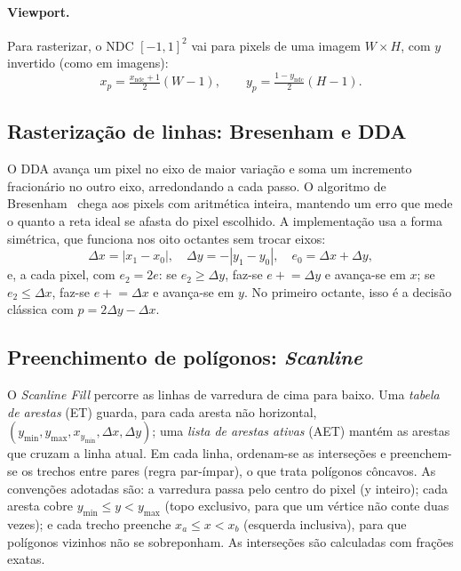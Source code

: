 \documentclass[11pt, a4paper]{article}
\begin{document}
\paragraph{Viewport.} Para rasterizar, o NDC $[-1,1]^2$ vai para pixels de uma imagem
$W\times H$, com $y$ invertido (como em imagens):
\begin{equation}
 x_p=\tfrac{x_{\text{ndc}}+1}{2}(W-1), \qquad y_p=\tfrac{1-y_{\text{ndc}}}{2}(H-1).
\end{equation}

\subsection{Rasterização de linhas: Bresenham e DDA}
O DDA avança um pixel no eixo de maior variação e soma um incremento fracionário no
outro eixo, arredondando a cada passo. O algoritmo de Bresenham~\cite{bresenham1965}
chega aos pixels com aritmética inteira, mantendo um erro que mede o quanto a reta
ideal se afasta do pixel escolhido. A implementação usa a forma simétrica, que
funciona nos oito octantes sem trocar eixos:
\begin{equation}
 \Delta x=|x_1-x_0|,\quad \Delta y=-|y_1-y_0|,\quad e_0=\Delta x+\Delta y,
\end{equation}
e, a cada pixel, com $e_2=2e$: se $e_2\ge\Delta y$, faz-se $e\mathrel{+}=\Delta y$ e avança-se em $x$;
se $e_2\le\Delta x$, faz-se $e\mathrel{+}=\Delta x$ e avança-se em $y$. No primeiro octante,
isso é a decisão clássica com $p=2\Delta y-\Delta x$.

\subsection{Preenchimento de polígonos: \emph{Scanline}}
O \emph{Scanline Fill} percorre as linhas de varredura de cima para baixo. Uma
\emph{tabela de arestas} (ET) guarda, para cada aresta não horizontal,
$(y_{\min},y_{\max},x_{y_{\min}},\Delta x,\Delta y)$; uma \emph{lista de arestas ativas}
(AET) mantém as arestas que cruzam a linha atual. Em cada linha, ordenam-se as
interseções e preenchem-se os trechos entre pares (regra par-ímpar), o que
trata polígonos côncavos. As convenções adotadas são: a varredura passa pelo centro
do pixel (y inteiro); cada aresta cobre $y_{\min}\le y<y_{\max}$ (topo exclusivo, para que
um vértice não conte duas vezes); e cada trecho preenche $x_a\le x<x_b$ (esquerda
inclusiva), para que polígonos vizinhos não se sobreponham. As interseções são
calculadas com frações exatas.
\end{document}
